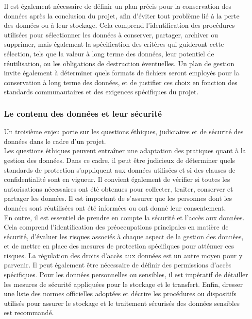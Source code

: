 Il est également nécessaire de définir un plan précis pour la conservation des données après la conclusion du projet, afin d’éviter tout problème lié à la perte des données ou à leur stockage. Cela comprend l'identification des procédures utilisées pour sélectionner les données à conserver, partager, archiver ou supprimer, mais également la spécification des critères qui guideront cette sélection, tels que la valeur à long terme des données, leur potentiel de réutilisation, ou les obligations de destruction éventuelles. Un plan de gestion invite également à déterminer quels formats de fichiers seront employés pour la conservation à long terme des données, et de justifier ces choix en fonction des standards communautaires et des exigences spécifiques du projet.

            \subsubsection{Le contenu des données et leur sécurité}

Un troisième enjeu porte sur les questions éthiques, judiciaires et de sécurité des données dans le cadre d’un projet.\\

Les questions éthiques peuvent entraîner une adaptation des pratiques quant à la gestion des données. Dans ce cadre, il peut être judicieux de déterminer quels standards de protection s'appliquent aux données utilisées et si des clauses de confidentialité sont en vigueur. Il convient également de vérifier si toutes les autorisations nécessaires ont été obtenues pour collecter, traiter, conserver et partager les données. Il est important de s'assurer que les personnes dont les données sont réutilisées ont été informées ou ont donné leur consentement.\\

En outre, il est essentiel de prendre en compte la sécurité et l’accès aux données. Cela comprend l’identification des préoccupations principales en matière de sécurité, d’évaluer les risques associés à chaque aspect de la gestion des données, et de mettre en place des mesures de protection spécifiques pour atténuer ces risques. La régulation des droits d’accès aux données est un autre moyen pour y parvenir. Il peut également être nécessaire de définir des permissions d’accès spécifiques. Pour les données personnelles ou sensibles, il est impératif de détailler les mesures de sécurité appliquées pour le stockage et le transfert. Enfin, dresser une liste des normes officielles adoptées et décrire les procédures ou dispositifs utilisés pour assurer le stockage et le traitement sécurisés des données sensibles est recommandé.\\

